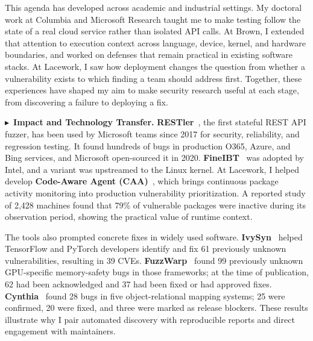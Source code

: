 \documentclass[10pt,letterpaper]{article}
\begin{document}
This agenda has developed across academic and industrial settings. My
doctoral work at Columbia and Microsoft Research taught me to make testing
follow the state of a real cloud service rather than isolated API calls. At
Brown, I extended that attention to execution context across language,
device, kernel, and hardware boundaries, and worked on defenses that remain
practical in existing software stacks. At Lacework, I saw how deployment
changes the question from whether a vulnerability exists to which finding a
team should address first. Together, these experiences have shaped my aim to
make security research useful at each stage, from discovering a failure to
deploying a fix.

{\noindent$\blacktriangleright$~\textbf{Impact and Technology Transfer.}}
\textbf{RESTler}~\cite{restler,restler2}, the first stateful REST API fuzzer,
has been used by Microsoft teams since 2017 for security, reliability, and
regression testing. It found hundreds of bugs in production O365, Azure, and
Bing services, and Microsoft open-sourced it in 2020.
\textbf{FineIBT}~\cite{fineibt} was adopted by Intel, and a variant was
upstreamed to the Linux kernel. At Lacework, I helped develop
\textbf{Code-Aware Agent (CAA)}~\cite{caa}, which brings continuous package
activity monitoring into production vulnerability prioritization. A reported
study of 2,428 machines found that 79\% of vulnerable packages were inactive
during its observation period, showing the practical value of runtime context.

The tools also prompted concrete fixes in widely used software.
\textbf{IvySyn}~\cite{ivysyn} helped TensorFlow and PyTorch developers
identify and fix 61 previously unknown vulnerabilities, resulting in 39 CVEs.
\textbf{FuzzWarp}~\cite{fuzzwarp} found 99 previously unknown GPU-specific
memory-safety bugs in those frameworks; at the time of publication, 62 had
been acknowledged and 37 had been fixed or had approved fixes.
\textbf{Cynthia}~\cite{cynthia} found 28 bugs in five object-relational
mapping systems; 25 were confirmed, 20 were fixed, and three were marked as
release blockers. These results illustrate why I pair automated discovery
with reproducible reports and direct engagement with maintainers.
\pagebreak
\end{document}
